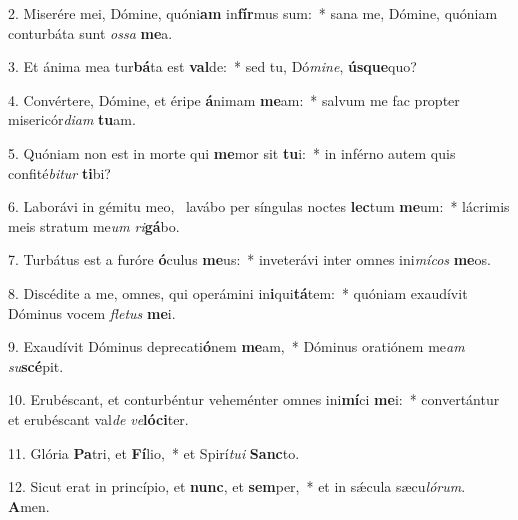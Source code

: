 2. Miserére mei, Dómine, quóni\textbf{am} in\textbf{fír}mus sum:~*  sana me, Dómine, quóniam conturbáta sunt \textit{os}\textit{sa} \textbf{me}a.\

3. Et ánima mea tur\textbf{bá}ta est \textbf{val}de:~*  sed tu, Dó\textit{mi}\textit{ne}, \textbf{ús}\textbf{que}quo?\

4. Convértere, Dómine, et éripe \textbf{á}nimam \textbf{me}am:~*  salvum me fac propter misericór\textit{di}\textit{am} \textbf{tu}am.\

5. Quóniam non est in morte qui \textbf{me}mor sit \textbf{tu}i:~*  in inférno autem quis confité\textit{bi}\textit{tur} \textbf{ti}bi?\

6. Laborávi in gémitu meo, \dag\  lavábo per síngulas noctes \textbf{lec}tum \textbf{me}um:~*  lácrimis meis stratum me\textit{um} \textit{ri}\textbf{gá}bo.\

7. Turbátus est a furóre \textbf{ó}culus \textbf{me}us:~*  inveterávi inter omnes ini\textit{mí}\textit{cos} \textbf{me}os.\

8. Discédite a me, omnes, qui operámini in\textbf{i}qui\textbf{tá}tem:~*  quóniam exaudívit Dóminus vocem \textit{fle}\textit{tus} \textbf{me}i.\

9. Exaudívit Dóminus deprecati\textbf{ó}nem \textbf{me}am,~*  Dóminus oratiónem me\textit{am} \textit{su}\textbf{scé}pit.\

10. Erubéscant, et conturbéntur veheménter omnes ini\textbf{mí}ci \textbf{me}i:~*  convertántur et erubéscant val\textit{de} \textit{ve}\textbf{ló}\textbf{ci}ter.\

11. Glória \textbf{Pa}tri, et \textbf{Fí}lio,~*  et Spirí\textit{tu}\textit{i} \textbf{Sanc}to.\

12. Sicut erat in princípio, et \textbf{nunc}, et \textbf{sem}per,~*  et in sǽcula sæcu\textit{ló}\textit{rum}. \textbf{A}men.\

